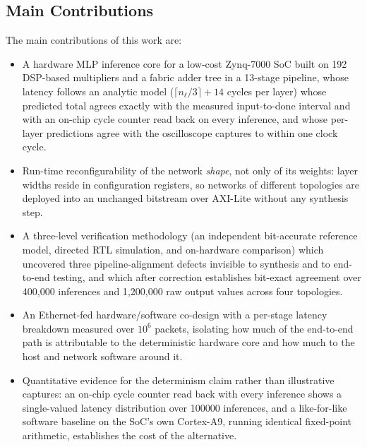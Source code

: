 \documentclass[final,5p,times,twocolumn]{elsarticle}
\begin{document}
\subsection{Main Contributions}
The main contributions of this work are:
\begin{itemize}
  \item A hardware MLP inference core for a low-cost Zynq-7000 SoC built on 192
        DSP-based multipliers and a fabric adder tree in a 13-stage pipeline,
        whose latency follows an analytic model
        ($\lceil n_\ell/3\rceil + 14$ cycles per layer) whose predicted total
        agrees exactly with the measured input-to-done interval and with an
        on-chip cycle counter read back on every inference, and whose per-layer
        predictions agree with the oscilloscope captures to within one clock
        cycle.
  \item Run-time reconfigurability of the network \emph{shape}, not only of its
        weights: layer widths reside in configuration registers, so networks of
        different topologies are deployed into an unchanged bitstream over
        AXI-Lite without any synthesis step.
  \item A three-level verification methodology (an independent bit-accurate
        reference model, directed RTL simulation, and on-hardware comparison)
        which uncovered three pipeline-alignment defects invisible to synthesis
        and to end-to-end testing, and which after correction establishes
        bit-exact agreement over 400{,}000 inferences and 1{,}200{,}000 raw
        output values across four topologies.
  \item An Ethernet-fed hardware/software co-design with a per-stage latency
        breakdown measured over $10^6$ packets, isolating how much of the
        end-to-end path is attributable to the deterministic hardware core and
        how much to the host and network software around it.
  \item Quantitative evidence for the determinism claim rather than
        illustrative captures: an on-chip cycle counter read back with every
        inference shows a single-valued latency distribution over \num{100000}
        inferences, and a like-for-like software baseline on the SoC's own
        Cortex-A9, running identical fixed-point arithmetic, establishes the
        cost of the alternative.
\end{itemize}
\end{document}
